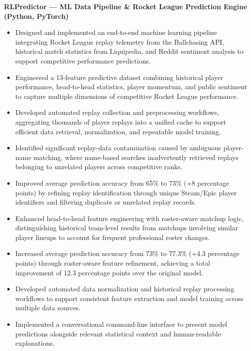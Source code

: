 \documentclass[10pt]{article}
\begin{document}
\textbf{RLPredictor — ML Data Pipeline \& Rocket League Prediction Engine (Python, PyTorch)}
    \begin{itemize}
        \item Designed and implemented an end-to-end machine learning pipeline integrating Rocket League replay telemetry from the Ballchasing API, historical match statistics from Liquipedia, and Reddit sentiment analysis to support competitive performance predictions.
    
        \item Engineered a 13-feature predictive dataset combining historical player performance, head-to-head statistics, player momentum, and public sentiment to capture multiple dimensions of competitive Rocket League performance.
    
        \item Developed automated replay collection and preprocessing workflows, aggregating thousands of player replays into a unified cache to support efficient data retrieval, normalization, and repeatable model training.
    
        \item Identified significant replay-data contamination caused by ambiguous player-name matching, where name-based searches inadvertently retrieved replays belonging to unrelated players across competitive ranks.
    
        \item Improved average prediction accuracy from 65\% to 73\% (+8 percentage points) by refining replay identification through unique Steam/Epic player identifiers and filtering duplicate or unrelated replay records.
    
        \item Enhanced head-to-head feature engineering with roster-aware matchup logic, distinguishing historical team-level results from matchups involving similar player lineups to account for frequent professional roster changes.
    
        \item Increased average prediction accuracy from 73\% to 77.3\% (+4.3 percentage points) through roster-aware feature refinement, achieving a total improvement of 12.3 percentage points over the original model.
    
        \item Developed automated data normalization and historical replay processing workflows to support consistent feature extraction and model training across multiple data sources.
    
        \item Implemented a conversational command-line interface to present model predictions alongside relevant statistical context and human-readable explanations.
    \end{itemize}
\end{document}

